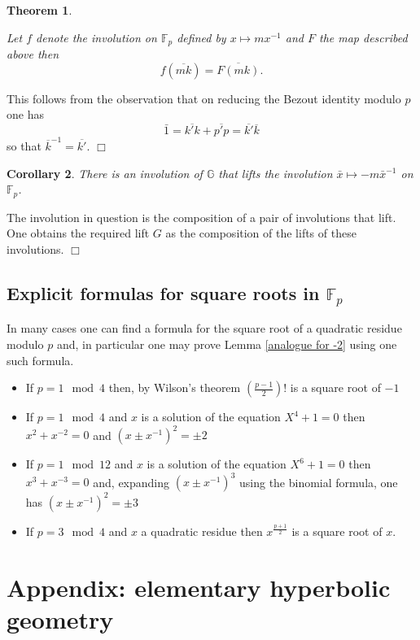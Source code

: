\documentclass[12pt,a4paper]{amsart}
\newtheorem{thm}{Theorem}[section]
\newtheorem{coro}[thm]{Corollary}
\def\GG{\mathbb{G}}
\def\fp{\mathbb{F}_p}
\begin{document}
\begin{thm} \label{actions agree}
	
Let $f$ denote the involution on $\fp $ defined by $ x \mapsto mx^{-1}$ 
and $F$ the map described above then 
$$ f(\overline{mk}) = \overline{F(mk)}.$$
\end{thm}

\proof
This follows from the observation that on reducing the Bezout
identity modulo $p$ one has
$$\bar{1} = \overline{k'k} + \overline{p'p}=  \overline{k'}\overline{k} $$
so that $\overline{k}^{-1} = \overline{k'}.$
\hfill $\Box$

\begin{coro}
There is an involution of $\GG$ that lifts the involution 
$\bar{x} \mapsto -m\bar{x}^{-1}$ on $\fp$.
\end{coro}
\proof The involution in question is the composition of a pair of
involutions that lift. 
One obtains the required lift $G$ as the composition of the lifts of
these involutions. 
\hfill $\Box$

\subsection{Explicit formulas for square roots in $\fp$}
\label{explicit formulas}

In many cases one can find a formula for the square root of a
quadratic residue modulo $p$ and,
in particular one may prove Lemma \ref{analogue for -2}
using one such  formula.


\begin{itemize}
	\item If $p = 1 \mod 4$ then, by Wilson's theorem
		$\left(\frac{p-1}{2}\right)!$ is a square root of $-1$
	\item If $p = 1 \mod 4$ and $x$ is a solution of the
		equation
		$X^4+1 = 0$ then $x^2 + x^{-2}=0$
		and $(x \pm x^{-1})^2 = \pm 2$
	
	\item If $p = 1 \mod 12$ and $x$ is a solution of the
		equation
		$X^6+1 = 0$ then $x^3 + x^{-3}=0$
		and, expanding  $(x\pm x^{-1})^3$
		using the binomial formula, one has
		$(x\pm x^{-1})^2 = \pm 3$
	\item If $p = 3 \mod 4$ and $x$ a quadratic residue
		then $x^\frac{p+1}{2}$ is a square root of
		$x$.
		
\end{itemize}

\section{Appendix: elementary hyperbolic geometry}
\label{appendix}
\end{document}
